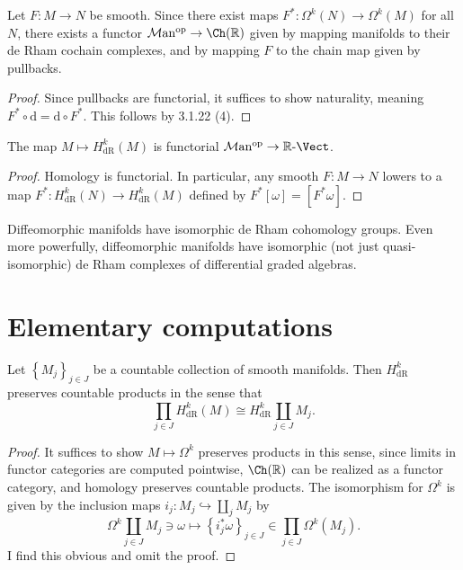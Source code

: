 \begin{lemma}\label{6.1.1}
	Let $F : M \to N$ be smooth. Since there exist maps $F^*: \Omega ^k(N) \to \Omega ^k(M)$ for all $N$, there exists a functor $\mathcal{M} \mathrm{an}^{\mathrm{op}} \to \Ch(\mathbb{R} ) $ given by mapping manifolds to their de Rham cochain complexes, and by mapping $F$ to the chain map given by pullbacks.
\end{lemma}
\begin{proof}
	Since pullbacks are functorial, it suffices to show naturality, meaning $F^*\circ \mathrm{d} =\mathrm{d} \circ F^*$. This follows by 3.1.22 (4).
\end{proof}
\begin{corollary}\label{6.1.2}
	The map $M\mapsto H_{\mathrm{dR} } ^k(M)$ is functorial $\mathcal{M} \mathrm{an} ^{\mathrm{op}} \to \mathbb{R} \text{-} \Vect$.
\end{corollary}
\begin{proof}
	Homology is functorial. In particular, any smooth $F : M \to N$ lowers to a map $F^*: H_{\mathrm{dR} } ^k(N) \to H_{\mathrm{dR} } ^k(M)$ defined by $F^*[\omega ]=[F^*\omega ]$.
\end{proof}
\begin{corollary}\label{6.1.3}
	Diffeomorphic manifolds have isomorphic de Rham cohomology groups. Even more powerfully, diffeomorphic manifolds have isomorphic (not just quasi-isomorphic) de Rham complexes of differential graded algebras.
\end{corollary}

\section{Elementary computations}

\begin{proposition}\label{6.2.1}
	Let $\left\{ M_j \right\} _{j\in J} $ be a countable collection of smooth manifolds. Then $H_{\mathrm{dR} } ^k$ preserves countable products in the sense that
	\[
		\prod_{j\in J} H_{\mathrm{dR} } ^k(M)\cong H_{\mathrm{dR} } ^k \coprod_{j\in J} M_j
	.\]
\end{proposition}
\begin{proof}
	It suffices to show $M\mapsto \Omega ^k$ preserves products in this sense, since limits in functor categories are computed pointwise, $\Ch(\mathbb{R} ) $ can be realized as a functor category, and homology preserves countable products. The isomorphism for $\Omega ^k$ is given by the inclusion maps $i_j : M_j\hookrightarrow \coprod_{j} M_j$ by
	\[
		\Omega ^k\coprod_{j\in J} M_j\ni\omega \mapsto \left\{ i^*_j\omega  \right\} _{j\in J} \in \prod_{j\in J} \Omega ^k(M_j)
	.\]
	I find this obvious and omit the proof.
\end{proof}


